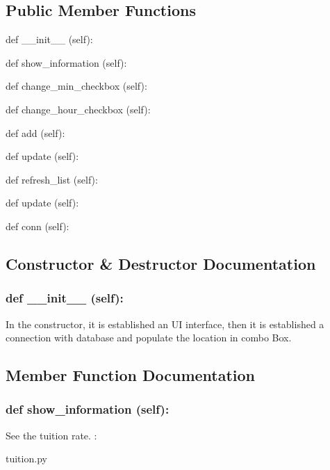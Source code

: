\subsection*{Public Member Functions}
\begin{DoxyCompactItemize}
\item 
def {\_\_init\_\_} (self):
\item 
def {show\_information} (self):
\item 
def {change\_min\_checkbox} (self):
\item 
def {change\_hour\_checkbox} (self):
\item 
def {add} (self):
\item 
def {update} (self):
\item 
def {refresh\_list} (self):
\item 
def {update} (self):
\item 
def {conn} (self):
\end{DoxyCompactItemize}

\subsection{Constructor \& Destructor Documentation}
\hypertarget{class_poly_aa3def076b74bed67904976ad4f9fe9b1}{
\subsubsection[{def __init__ (self):}]{\setlength{\rightskip}{0pt plus 5cm}def {\_\_init\_\_} (self): 
}}
In the constructor, it is established an UI interface, then it is  established a connection with database and populate the location in combo Box.
 

\subsection{Member Function Documentation}
\hypertarget{class_poly_a14a7ad77ce612b0c54f531d307ee4b39}{
\subsubsection[{def show_information (self):}]{\setlength{\rightskip}{0pt plus 5cm}def {show\_information} (self):}}\label{class_poly_a14a7ad77ce612b0c54f531d307ee4b39}
See the tuition rate.
:\begin{DoxyCompactItemize}
\item 
tuition.\-py\end{DoxyCompactItemize}

